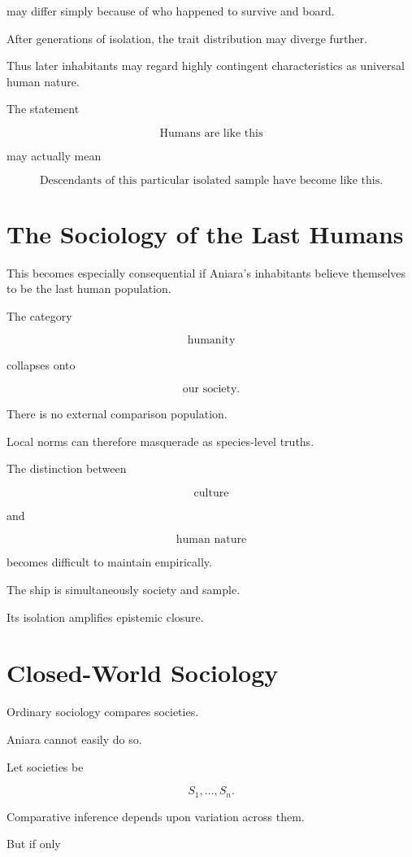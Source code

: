 \documentclass[11pt,oneside]{book}
\theoremstyle{definition}
\theoremstyle{remark}
\begin{document}
may differ simply because of who happened to survive and board.

After generations of isolation, the trait distribution may diverge further.

Thus later inhabitants may regard highly contingent characteristics as universal human nature.

The statement

\[
\text{Humans are like this}
\]

may actually mean

\[
\text{Descendants of this particular isolated sample have become like this}.
\]

\section{The Sociology of the Last Humans}

This becomes especially consequential if Aniara's inhabitants believe themselves to be the last human population.

The category

\[
\text{humanity}
\]

collapses onto

\[
\text{our society}.
\]

There is no external comparison population.

Local norms can therefore masquerade as species-level truths.

The distinction between

\[
\text{culture}
\]

and

\[
\text{human nature}
\]

becomes difficult to maintain empirically.

The ship is simultaneously society and sample.

Its isolation amplifies epistemic closure.

\section{Closed-World Sociology}

Ordinary sociology compares societies.

Aniara cannot easily do so.

Let societies be

\[
S_1,\ldots,S_n.
\]

Comparative inference depends upon variation across them.

But if only
\end{document}
